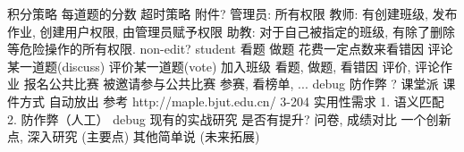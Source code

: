 \markdownRendererUlItem 积分策略\markdownRendererUlItemEnd 
\markdownRendererUlItem 每道题的分数\markdownRendererUlItemEnd 
\markdownRendererUlItem 超时策略\markdownRendererUlItemEnd 
\markdownRendererUlItem 附件?\markdownRendererUlItemEnd 
\markdownRendererUlEndTight \markdownRendererInterblockSeparator
{}\markdownRendererInterblockSeparator
{}\markdownRendererUlBeginTight
\markdownRendererUlItem 管理员: 所有权限\markdownRendererUlItemEnd 
\markdownRendererUlItem 教师: 有创建班级, 发布作业, 创建用户权限, 由管理员赋予权限\markdownRendererUlItemEnd 
\markdownRendererUlItem 助教: 对于自己被指定的班级, 有除了删除等危险操作的所有权限.\markdownRendererUlItemEnd 
\markdownRendererUlItem non-edit?\markdownRendererUlItemEnd 
\markdownRendererUlItem student\markdownRendererUlItemEnd 
\markdownRendererUlEndTight \markdownRendererInterblockSeparator
{}\markdownRendererInterblockSeparator
{}\markdownRendererInterblockSeparator
{}\markdownRendererUlBeginTight
\markdownRendererUlItem 看题\markdownRendererUlItemEnd 
\markdownRendererUlItem 做题\markdownRendererUlItemEnd 
\markdownRendererUlItem 花费一定点数来看错因\markdownRendererUlItemEnd 
\markdownRendererUlItem 评论某一道题(discuss)\markdownRendererUlItemEnd 
\markdownRendererUlItem 评价某一道题(vote)\markdownRendererUlItemEnd 
\markdownRendererUlEndTight \markdownRendererInterblockSeparator
{}\markdownRendererInterblockSeparator
{}\markdownRendererUlBeginTight
\markdownRendererUlItem 加入班级\markdownRendererUlItemEnd 
\markdownRendererUlItem 看题, 做题, 看错因\markdownRendererUlItemEnd 
\markdownRendererUlItem 评价, 评论作业\markdownRendererUlItemEnd 
\markdownRendererUlItem \markdownRendererUlItemEnd 
\markdownRendererUlEndTight \markdownRendererInterblockSeparator
{}\markdownRendererInterblockSeparator
{}\markdownRendererUlBeginTight
\markdownRendererUlItem 报名公共比赛\markdownRendererUlItemEnd 
\markdownRendererUlItem 被邀请参与公共比赛\markdownRendererUlItemEnd 
\markdownRendererUlItem 参赛, 看榜单, ...\markdownRendererUlItemEnd 
\markdownRendererUlEndTight \markdownRendererInterblockSeparator
{}\markdownRendererInterblockSeparator
{}debug 防作弊 ? 课堂派 课件方式 自动放出 参考  http://maple.bjut.edu.cn/ 3-204\markdownRendererInterblockSeparator
{}实用性需求 1. 语义匹配 2. 防作弊（人工）\markdownRendererInterblockSeparator
{}debug\markdownRendererInterblockSeparator
{}现有的实战研究 是否有提升?\markdownRendererInterblockSeparator
{}问卷, 成绩对比\markdownRendererInterblockSeparator
{}一个创新点, 深入研究 (主要点) 其他简单说 (未来拓展)\relax